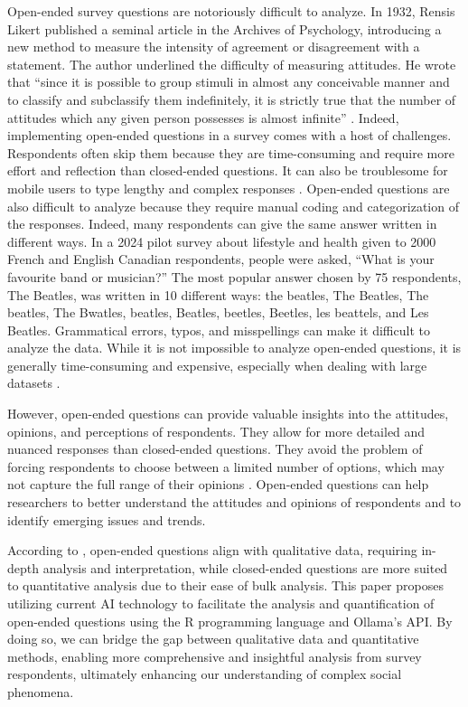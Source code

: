 \documentclass[
  authoryear,
  preprint,
  3p]{elsarticle}
\begin{document}
Open-ended survey questions are notoriously difficult to analyze. In
1932, Rensis Likert published a seminal article in the Archives of
Psychology, introducing a new method to measure the intensity of
agreement or disagreement with a statement. The author underlined the
difficulty of measuring attitudes. He wrote that ``since it is possible
to group stimuli in almost any conceivable manner and to classify and
subclassify them indefinitely, it is strictly true that the number of
attitudes which any given person possesses is almost infinite''
\citep{likert32}. Indeed, implementing open-ended questions in a survey
comes with a host of challenges. Respondents often skip them because
they are time-consuming and require more effort and reflection than
closed-ended questions. It can also be troublesome for mobile users to
type lengthy and complex responses \citep{dillman_etal14}. Open-ended
questions are also difficult to analyze because they require manual
coding and categorization of the responses. Indeed, many respondents can
give the same answer written in different ways. In a 2024 pilot survey
about lifestyle and health given to 2000 French and English Canadian
respondents, people were asked, ``What is your favourite band or
musician?'' The most popular answer chosen by 75 respondents, The
Beatles, was written in 10 different ways: the beatles, The Beatles, The
beatles, The Bwatles, beatles, Beatles, beetles, Beetles, les beattels,
and Les Beatles. Grammatical errors, typos, and misspellings can make it
difficult to analyze the data. While it is not impossible to analyze
open-ended questions, it is generally time-consuming and expensive,
especially when dealing with large datasets
\citep{dillman_etal14, bradburn_etal04}.

However, open-ended questions can provide valuable insights into the
attitudes, opinions, and perceptions of respondents. They allow for more
detailed and nuanced responses than closed-ended questions. They avoid
the problem of forcing respondents to choose between a limited number of
options, which may not capture the full range of their opinions
\citep{dillman_etal14}. Open-ended questions can help researchers to
better understand the attitudes and opinions of respondents and to
identify emerging issues and trends.

According to \citet{bickman_rog09}, open-ended questions align with
qualitative data, requiring in-depth analysis and interpretation, while
closed-ended questions are more suited to quantitative analysis due to
their ease of bulk analysis. This paper proposes utilizing current AI
technology to facilitate the analysis and quantification of open-ended
questions using the R programming language and Ollama's API. By doing
so, we can bridge the gap between qualitative data and quantitative
methods, enabling more comprehensive and insightful analysis from survey
respondents, ultimately enhancing our understanding of complex social
phenomena.
\end{document}
